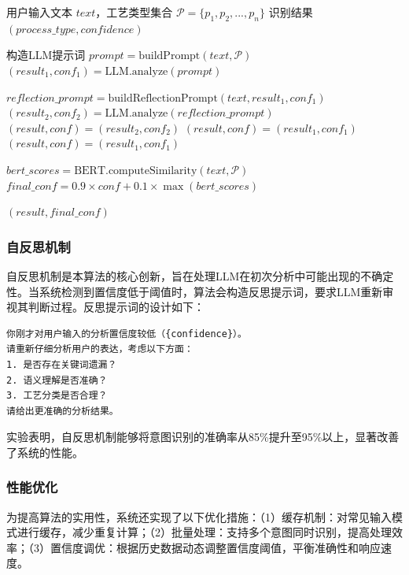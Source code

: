 \documentclass[preprint,12pt]{elsarticle}
\begin{document}
\begin{algorithm}[htbp]
\caption{LLM驱动的意图识别算法}
\label{alg:intent-recognition}
\begin{algorithmic}[1]
\Require 用户输入文本 $text$，工艺类型集合 $\mathcal{P} = \{p_1, p_2, ..., p_n\}$
\Ensure 识别结果 $(process\_type, confidence)$

\State 构造LLM提示词 $prompt = \text{buildPrompt}(text, \mathcal{P})$
\State $(result_1, conf_1) = \text{LLM.analyze}(prompt)$

    \State $reflection\_prompt = \text{buildReflectionPrompt}(text, result_1, conf_1)$
    \State $(result_2, conf_2) = \text{LLM.analyze}(reflection\_prompt)$
        \State $(result, conf) = (result_2, conf_2)$
    \Else
        \State $(result, conf) = (result_1, conf_1)$
    \EndIf
\Else
    \State $(result, conf) = (result_1, conf_1)$
\EndIf

\State $bert\_scores = \text{BERT.computeSimilarity}(text, \mathcal{P})$
\State $final\_conf = 0.9 \times conf + 0.1 \times \max(bert\_scores)$

\Return $(result, final\_conf)$
\end{algorithmic}
\end{algorithm}

\subsubsection{自反思机制}

自反思机制是本算法的核心创新，旨在处理LLM在初次分析中可能出现的不确定性。当系统检测到置信度低于阈值时，算法会构造反思提示词，要求LLM重新审视其判断过程。反思提示词的设计如下：

\begin{verbatim}
你刚才对用户输入的分析置信度较低（{confidence}）。
请重新仔细分析用户的表达，考虑以下方面：
1. 是否存在关键词遗漏？
2. 语义理解是否准确？
3. 工艺分类是否合理？
请给出更准确的分析结果。
\end{verbatim}

实验表明，自反思机制能够将意图识别的准确率从85\%提升至95\%以上，显著改善了系统的性能。

\subsubsection{性能优化}

为提高算法的实用性，系统还实现了以下优化措施：（1）缓存机制：对常见输入模式进行缓存，减少重复计算；（2）批量处理：支持多个意图同时识别，提高处理效率；（3）置信度调优：根据历史数据动态调整置信度阈值，平衡准确性和响应速度。
\end{document}
